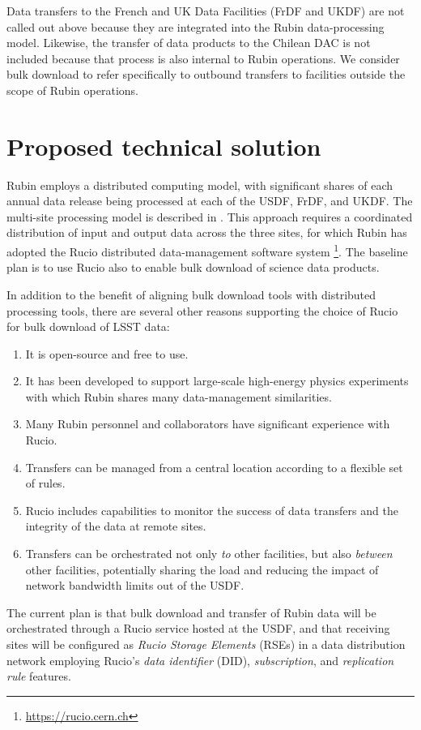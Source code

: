Data transfers to the French and UK Data Facilities (FrDF and UKDF) are not called out above because they are integrated into the Rubin data-processing model. Likewise, the transfer of data products to the Chilean DAC is not included because that process is also internal to Rubin operations. We consider bulk download to refer specifically to outbound transfers to facilities outside the scope of Rubin operations.

\section{Proposed technical solution}

Rubin employs a distributed computing model, with significant shares of each annual data release being processed at each of the USDF, FrDF, and UKDF. The multi-site processing model is described in . This approach requires a coordinated distribution of input and output data across the three sites, for which Rubin has adopted the Rucio distributed data-management software system \citep{Barisits2019} \footnote{\url{https://rucio.cern.ch}}. The baseline plan is to use Rucio also to enable bulk download of science data products.

In addition to the benefit of aligning bulk download tools with distributed processing tools, there are several other reasons supporting the choice of Rucio for bulk download of LSST data:
\begin{enumerate}
\item It is open-source and free to use.
\item It has been developed to support large-scale high-energy physics experiments with which Rubin shares many data-management similarities.
\item Many Rubin personnel and collaborators have significant experience with Rucio. 
\item Transfers can be managed from a central location according to a flexible set of rules.
\item Rucio includes capabilities to monitor the success of data transfers and the integrity of the data at remote sites.
\item Transfers can be orchestrated not only \textit{to} other facilities, but also \textit{between} other facilities, potentially sharing the load and reducing the impact of network bandwidth limits out of the USDF.
\end{enumerate}

The current plan is that bulk download and transfer of Rubin data will be orchestrated through a Rucio service hosted at the USDF, and that receiving sites will be configured as \textit{Rucio Storage Elements} (RSEs) in a data distribution network employing Rucio's \textit{data identifier} (DID), \textit{subscription}, and \textit{replication rule} features.

